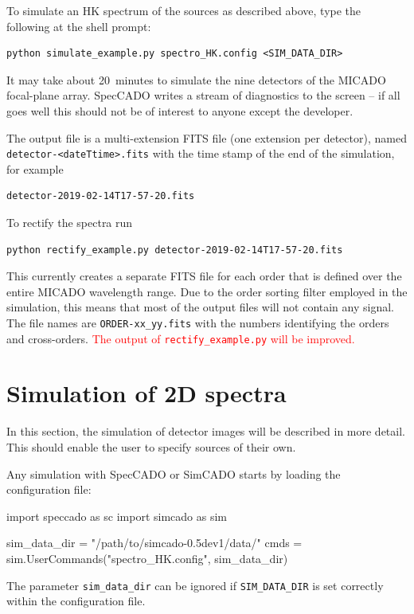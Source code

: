 \documentclass[a4paper,twoside,11pt]{article}
\begin{document}
To simulate an HK spectrum of the sources as described above, type the
following at the shell prompt:
\begin{lstlisting}[style=csh]
python simulate_example.py spectro_HK.config <SIM_DATA_DIR>
\end{lstlisting}
It may take about 20~minutes to simulate the nine detectors of the
MICADO focal-plane array. SpecCADO writes a stream of diagnostics to
the screen -- if all goes well this should not be of interest to
anyone except the developer.

The output file is a multi-extension FITS file (one extension per
detector), named \lstinline{detector-<dateTtime>.fits} with
the time stamp of the end of the simulation, for example
\begin{lstlisting}[style=csh]
detector-2019-02-14T17-57-20.fits
\end{lstlisting}

To rectify the spectra run
\begin{lstlisting}[style=csh]
python rectify_example.py detector-2019-02-14T17-57-20.fits
\end{lstlisting}
This currently creates a separate FITS file for each order that is
defined over the entire MICADO wavelength range. Due to the order
sorting filter employed in the simulation, this means that most of the
output files will not contain any signal. The file names are
\lstinline{ORDER-xx_yy.fits} with the numbers identifying the orders
and cross-orders. \textcolor{red}{The output of
  \lstinline{rectify_example.py}
  will be improved.}


\section{Simulation of 2D spectra}
\label{sec:simulation}

In this section, the simulation of detector images will be described
in more detail. This should enable the user to specify sources of
their own.

Any simulation with SpecCADO or SimCADO starts by loading the
configuration file:
\begin{pyin}
import speccado as sc
import simcado as sim

sim_data_dir = "/path/to/simcado-0.5dev1/data/"
cmds = sim.UserCommands("spectro_HK.config", sim_data_dir)
\end{pyin}
The parameter \lstinline{sim_data_dir} can be ignored if
\lstinline{SIM_DATA_DIR} is set correctly within the configuration
file.
\end{document}
